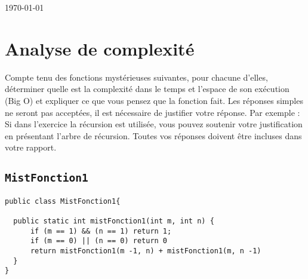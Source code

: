 \documentclass[10pt]{report}
\begin{document}
\begin{titlepage}
	
	\vfill\vfill\vfill %
	
	{\large\today} %
	
	
	 
	
	\vfill %
	
\end{titlepage}
\pagebreak
\tableofcontents
\pagebreak


  \vspace{-2em}
  \chapter{Analyse de complexité}

  \vspace{-2em}
  \begin{Exercice}{}{}
    Compte tenu des fonctions mystérieuses suivantes, pour chacune d’elles, 
    déterminer quelle est la complexité dans le temps et l’espace de son exécution 
    (Big O) et expliquer ce que vous pensez que la fonction fait. Les réponses 
    simples ne seront pas acceptées, il est nécessaire de justifier votre réponse.
    Par exemple : Si dans l’exercice la récursion est utilisée, vous pouvez 
    soutenir votre justification en présentant l’arbre de récursion. 
    Toutes vos réponses doivent être incluses dans votre rapport.
  \end{Exercice}
  \section{\texttt{MistFonction1}}
  \vspace{-3em}
  \vspace{-1em}

  \begin{lstlisting}[style=JavaDraculaWhite]
public class MistFonction1{

  public static int mistFonction1(int m, int n) {
      if (m == 1) && (n == 1) return 1; 
      if (m == 0) || (n == 0) return 0
      return mistFonction1(m -1, n) + mistFonction1(m, n -1)
  }
}\end{lstlisting}
  \vspace{-2em}
\end{document}
